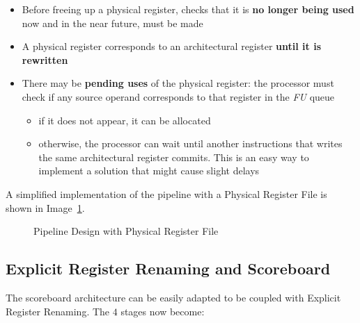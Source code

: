 \documentclass[english]{article}
\begin{document}
\begin{itemize}
  \item Before freeing up a physical register, checks that it is \textbf{no longer being used} now and in the near future, must be made
  \item A physical register corresponds to an architectural register \textbf{until it is rewritten}
  \item There may be \textbf{pending uses} of the physical register: the processor must check if any source operand corresponds to that register in the \textit{FU} queue
        \begin{itemize}
          \item if it does not appear, it can be allocated
          \item otherwise, the processor can wait until another instructions that writes the same architectural register commits. This is an easy way to implement a solution that might cause slight delays
        \end{itemize}
\end{itemize}

A simplified implementation of the pipeline with a Physical Register File is shown in Image~\ref{fig:pipeline-design-with-physical-register-file}.

\begin{figure}[htbp]
  \bigskip
  \centering
  \caption{Pipeline Design with Physical Register File}
  \label{fig:pipeline-design-with-physical-register-file}
  \bigskip
\end{figure}

\subsection{Explicit Register Renaming and Scoreboard}

The scoreboard architecture can be easily adapted to be coupled with Explicit Register Renaming.
The \(4\) stages now become:
\end{document}
